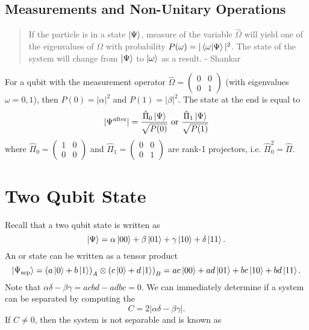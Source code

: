 \documentclass{article}
\numberwithin{equation}{section}
\begin{document}
\subsection{Measurements and Non-Unitary Operations}
\begin{quotation}
    If the particle is in a state $\ket\Psi$, measure of the variable $\hat{\Omega}$ will yield one of the eigenvalues of $\Omega$ with probability $P(\omega) = |\bra{\omega}\ket{\Psi}|^2$. The state of the system will change from $\ket{\Psi}$ to $\ket\omega$ as a result. - Shankar
\end{quotation}
For a qubit with the measurement operator $\hat{\Omega} = \begin{pmatrix}
    0 & 0 \\ 
    0 & 1
\end{pmatrix}$ (with eigenvalues $\omega=0,1$), then $P(0)= |\alpha|^2$ and $P(1) = |\beta|^2$. The state at the end is equal to
\begin{equation}
    |\Psi^\text{after}| = \frac{\hat{\Pi}_0\ket\Psi}{\sqrt{P(0)}} \text{ or }\frac{\hat{\Pi}_1\ket\Psi}{\sqrt{P(1)}} 
\end{equation}
where $\hat{\Pi}_0 = \begin{pmatrix}
    1 & 0 \\ 0 & 0 \end{pmatrix}$ and $\hat{\Pi}_1 = \begin{pmatrix} 0 & 0 \\ 0 & 1
\end{pmatrix}$ are rank-1 projectors, i.e. $\hat{\Pi}_0^2 = \hat{\Pi}.$
\newpage
\section{Two Qubit State}
Recall that a two qubit state is written as 
\begin{equation}
    \ket\Psi = \alpha\ket{00} + \beta\ket{01} + \gamma\ket{10} + \delta\ket{11}.
\end{equation}
An  or  state can be written as a tensor product 
\begin{equation}
    \ket{\Psi_\text{sep}} = \left(a\ket 0 + b\ket 1\right)_A \otimes \left(c\ket 0 + d\ket 1\right)_B = ac\ket{00} + ad\ket{01} + bc\ket{10} + bd\ket{11}.
\end{equation}
Note that $\alpha \delta - \beta\gamma = acbd-adbc = 0.$ We can immediately determine if a system can be separated by computing the 
\begin{equation}
    C = 2|\alpha \delta - \beta\gamma|.
\end{equation}
If $C\neq 0$, then the system is not separable and is known as 
\end{document}
